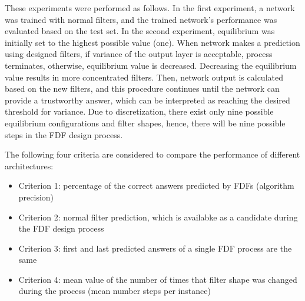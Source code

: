 \documentclass[journal]{IEEEtran}
\begin{document}
These experiments were performed as follows. In the first experiment, a network was trained with normal filters, and the trained network's performance was evaluated based on the test set. In the second experiment, equilibrium was initially set to the highest possible value (one). When network makes a prediction using designed filters, if variance of the output layer is acceptable, process terminates, otherwise, equilibrium value is decreased. Decreasing the equilibrium value results in more concentrated filters.  Then, network output is calculated based on the new filters, and this procedure continues until the network can provide a trustworthy answer, which can be interpreted as reaching the desired threshold for variance. 
Due to discretization, there exist only nine possible equilibrium configurations and filter shapes, hence, there will be nine possible steps in the FDF design process.

The following four criteria are considered to compare the performance of different architectures: 
\begin{itemize}
\item Criterion 1: percentage of the correct answers predicted by FDFs (algorithm precision)
\item Criterion 2: normal filter prediction, which is availabke as a candidate during the FDF design process
\item Criterion 3: first and last predicted answers of a single FDF process are the same
\item Criterion 4: mean value of the number of times that filter shape was changed during the process (mean number steps per instance)
\end{itemize}
\end{document}
